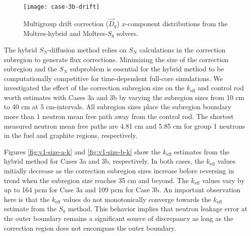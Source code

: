 \begin{figure}[p]
  \centering
  \texttt{[image: case-3b-drift]}
  \caption{Multigroup drift correction ($\vec{D}_g$) $x$-component distributions from the
  Moltres-hybrid and Moltres-$S_8$ solvers.}
  \label{fig:3b-drift}
\end{figure}


\FloatBarrier


The hybrid $S_N$-diffusion method relies on $S_N$ calculations in the correction subregion to
generate flux corrections. Minimizing the size of the correction subregion and the $S_N$ subproblem
is essential for the hybrid method to be computationally competitive for time-dependent full-core
simulations. We investigated the effect of the correction subregion size on the $k_\text{eff}$ and
control rod worth estimates with Cases 3a and 3b by varying the subregion sizes from 10 cm to 40 cm
at 5 cm-intervals. All subregion sizes place the subregion boundary more than 1 neutron mean free
path away from the control rod. The shortest measured neutron mean free paths are 4.81 cm and 5.85
cm for group 1 neutrons in the fuel and graphite regions, respectively.

Figures \ref{fig:v1-size-a-k} and \ref{fig:v1-size-b-k} show the $k_\text{eff}$ estimates from the
hybrid method for Cases 3a and 3b, respectively. In both cases, the $k_\text{eff}$ values initially
decrease as the correction subregion sizes increase before reversing in trend when the subregion
size reaches 35 cm and beyond. The $k_\text{eff}$ values vary by up to 164 pcm for Case 3a and 109
pcm for Case 3b. An important observation here is that the $k_\text{eff}$ values do not
monotonically converge towards the $k_\text{eff}$ estimate from the $S_8$ method. This behavior
implies that neutron leakage error at the outer boundary remains a significant source of
discrepancy as long as the correction region does not encompass the outer boundary.

